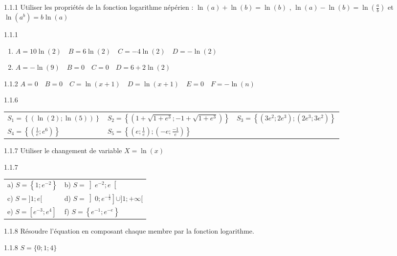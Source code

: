 \begin{Indication}{1.1.1}
	Utiliser les propriétés de la fonction logarithme népérien : $\ln(a)+\ln(b)=\ln(b)$ , $\ln(a)-\ln(b)=\ln\left(\frac{a}{b}\right)$ et $\ln\left(a^b\right)=b\ln(a)$
\end{Indication}
\begin{Solution}{1.1.1}
\begin{enumerate}
	\item $A=10\ln(2) \quad B=6\ln(2) \quad C=-4\ln(2) \quad D=-\ln(2)$
	\item $A=-\ln(9) \quad B=0 \quad C=0 \quad D=6+2\ln(2)$
\end{enumerate}
\end{Solution}
\begin{Solution}{1.1.2}
	$A=0 \quad B=0 \quad C=\ln(x+1) \quad D=\ln(x+1) \quad E=0 \quad F=-\ln(n)$
\end{Solution}
\begin{Solution}{1.1.6}
\begin{tabular}{p{} p{} p{}}
	$S_1=\left\{\left(\ln(2);\ln(5)\right)\right\}$ & $S_2=\left\{\left(1+\sqrt{1+e^3};-1+\sqrt{1+e^3}\right)\right\}$ & $S_3=\left\{\left(3e^2;2e^3\right);\left(2e^3;3e^2\right)\right\}$\\
	$S_4=\left\{\left(\frac{1}{e};e^6\right)\right\}$ & $S_5=\left\{\left(e;\frac{1}{e}\right);\left(-e;\frac{-1}{e}\right)\right\}$
\end{tabular}
\end{Solution}
\begin{Indication}{1.1.7}
	Utiliser le changement de variable $X=\ln(x)$
\end{Indication}
\begin{Solution}{1.1.7}
	\begin{tabular}{p{} p{}}
		a) $S=\left\{1;e^{-2}\right\}$ & b) $S=\left]e^{-2};e\right[$ \\
		c) $S=]1;e[$ & d) $S=\left]0;e^{-\frac{1}{2}}\right]\cup]1;+\infty[$\\
		e) $S=\left[e^{-3};e^4\right]$ & f) $S=\left\{e^{-1};e^{-e}\right\}$
    \end{tabular}
\end{Solution}
\begin{Indication}{1.1.8}
	Résoudre l'équation en composant chaque membre par la fonction logarithme.
\end{Indication}
\begin{Solution}{1.1.8}
	$S=\{0;1;4\}$
\end{Solution}
